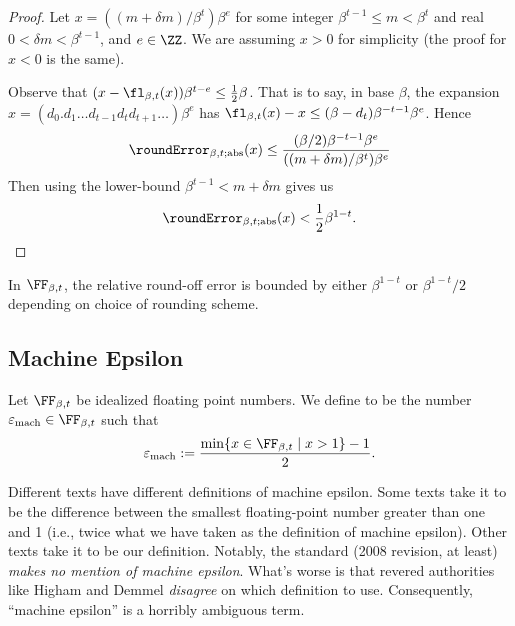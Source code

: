 \begin{proof}
Let $x=((m+\delta m)/\beta^{t})\beta^{e}$ for some integer $\beta^{t-1}\leq m<\beta^{t}$
and real $0<\delta m<\beta^{t-1}$, and $e\in\ZZ$. We are assuming $x>0$
for simplicity (the proof for $x<0$ is the same). 

Observe that $(x - \fl_{\beta,t}(x))\beta^{t-e}\leq \frac{1}{2}\beta$.
That is to say, in base $\beta$, the expansion $x = (d_{0}.d_{1}\dots d_{t-1}d_{t}d_{t+1}\dots)\beta^{e}$
has $\fl_{\beta,t}(x) - x\leq (\beta -d_{t})\beta^{-t-1}\beta^{e}$. Hence
\begin{equation}
  \roundError_{\beta,t;\text{abs}}(x)\leq
  \frac{(\beta/2)\beta^{-t-1}\beta^{e}}{((m+\delta m)/\beta^{t})\beta^{e}}
\end{equation}
Then using the lower-bound $\beta^{t-1}< m+\delta m$ gives us
\begin{equation*}
  \roundError_{\beta,t;\text{abs}}(x) < \frac{1}{2}\beta^{1-t}.\qedhere
\end{equation*}
\end{proof}


\begin{thm}
  In $\FF_{\beta,t}$, the relative round-off error is bounded by either
  $\beta^{1-t}$ or $\beta^{1-t}/2$ depending on choice of rounding scheme.
\end{thm}

\subsection{Machine Epsilon}

\begin{defn}\label{defn:idealized:machine-epsilon}
Let $\FF_{\beta,t}$ be idealized floating point numbers. We define
 to be the number
$\varepsilon_{\text{mach}}\in\FF_{\beta,t}$ such that
\begin{equation}
\varepsilon_{\text{mach}} := \frac{\min\{x\in\FF_{\beta,t}\mid x>1\}-1}{2}.
\end{equation}
\end{defn}

\begin{ddanger}
  Different texts have different definitions of machine epsilon. Some
  texts take it to be the difference between the smallest floating-point
  number greater than one and 1 (i.e., twice what we have taken as the
  definition of machine epsilon). Other texts take it to be our
  definition. Notably, the  standard (2008 revision, at least)
  \emph{makes no mention of machine epsilon}. What's worse is that 
  revered authorities like Higham and Demmel \emph{disagree} on which
  definition to use. Consequently, ``machine epsilon'' is a horribly
  ambiguous term.
\end{ddanger}

